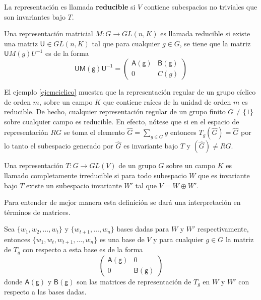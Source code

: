 La representación es llamada \textbf{reducible} si $V$ contiene  subespacios no triviales que son invariantes bajo $T$. 

\begin{definicion}
Una representación matricial $M \colon G \to GL(n,K)$ es llamada reducible si existe una matriz $\mathsf{U} \in GL(n,K)$ tal que para cualquier $g \in G$, se tiene que la matriz $\mathsf{U}M(g)U^{-1}$ es de la forma
\begin{equation*}
\mathsf{UM(g)U^{-1}} = \begin{pmatrix}
\mathsf{A(g)} & \mathsf{B(g)} \\
0 & C(g)
\end{pmatrix} 
\end{equation*}  

\end{definicion}

El ejemplo \ref{ejemciclico} muestra que la representación regular de un grupo cíclico de orden $m$, sobre un campo $K$ que contiene raíces de la unidad de orden $m$ es reducible. De hecho, cualquier representación regular de un grupo finito $G \neq \{ 1 \}$ sobre cualquier campo es reducible. En efecto, nótese que si en el espacio de representación $RG$ se toma el elemento $\hat{G} = \sum_{g \in G}g$ entonces $ T_g(\hat{G}) = \hat{G}$ por lo tanto el subespacio generado por $\hat{G}$ es invariante bajo $T$ y $(\hat{G}) \neq RG.$  

\begin{definicion}
Una representación $T \colon G \to GL(V)$ de un grupo $G$ sobre un campo $K$ es llamado completamente irreducible si para todo subespacio $W$ que es invariante bajo $T$ existe un subespacio invariante $W'$ tal que $V = W \oplus W'.$
\end{definicion}

Para entender de mejor manera esta definición se dará una interpretación en términos de matrices.

Sea $\{ w_1, w_2, \dots, w_t \}$ y $\{ w_{t+1}, \dots, w_n\}$ bases dadas para $W$ y $W'$ respectivamente, entonces $\{ w_1, w_t, w_{t+1}, \dots, w_n \}$ es una base de $V$ y para cualquier $g \in G$ la matriz de $T_g$ con respecto a esta base es de la forma
\begin{equation*} \begin{pmatrix}
\mathsf{A(g)} & 0 \\
0 & \mathsf{B(g)}
\end{pmatrix} \end{equation*} donde $\mathsf{A(g)}$ y $\mathsf{B(g)}$ son las matrices de representación de $T_g$ en $W$ y $W'$ con respecto a las bases dadas. 

